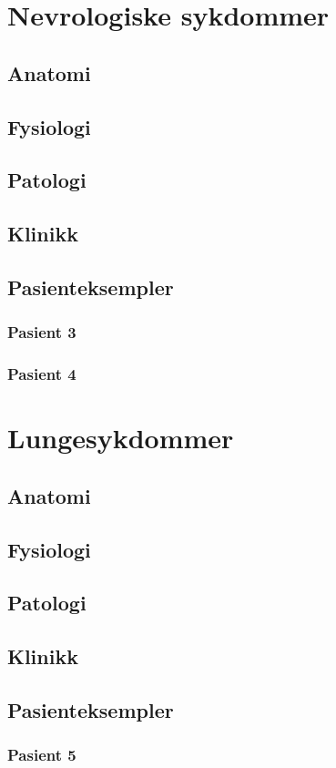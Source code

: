 \documentclass[12pt]{memoir} %
\begin{document}
\begin{itemize}
	\chapter{Nevrologiske sykdommer}
		\section{Anatomi}
		\section{Fysiologi}	
		\section{Patologi}
		\section{Klinikk}
		\section{Pasienteksempler}
			\subsection{Pasient 3}
			\subsection{Pasient 4}
	\chapter{Lungesykdommer}
		\section{Anatomi}
		\section{Fysiologi}
		\section{Patologi}
		\section{Klinikk}
		\section{Pasienteksempler}
			\subsection{Pasient 5}

\end{itemize}
\end{document}
